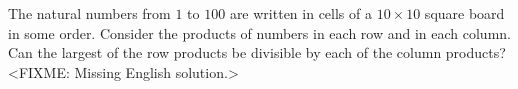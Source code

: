 \problem
The natural numbers from $1$ to $100$ are written in cells of a $10 \times 10$
square board in some order.
Consider the products of numbers in each row and in each column. 
Can the largest of the row products be divisible by each of the column
products?
\solution
<FIXME: Missing English solution.>
\endproblem
